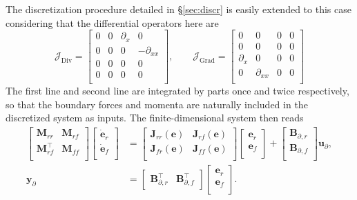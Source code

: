 \documentclass{svjour3}                     %
\newcommand{\secref}[1]{\S\ref{#1}}
\DeclareMathOperator*{\Grad}{Grad}
\DeclareMathOperator*{\Div}{Div}
\begin{document}
The discretization procedure detailed in \secref{sec:discr} is easily extended to this case considering that the differential operators here are 
\[
\bm{\mathcal{J}}_{\Div} = \begin{bmatrix}
0 & 0 & \partial_x & 0 \\
0 & 0 & 0 & -\partial_{xx} \\
0 & 0 & 0 & 0 \\
0 & 0 & 0 & 0 \\
\end{bmatrix}, \qquad 
\bm{\mathcal{J}}_{\Grad} = \begin{bmatrix}
0 & 0 & 0 & 0 \\
0 & 0 & 0 & 0 \\
\partial_x & 0 & 0 & 0 \\
0 & \partial_{xx} & 0 & 0 \\
\end{bmatrix}
\]
The first line and second line are integrated by parts once and twice respectively, so that the boundary forces and momenta are naturally included in the discretized system as inputs. The finite-dimensional system then reads
\begin{equation}
\label{eq:EB_sys}
\begin{aligned}
\begin{bmatrix}
\bm{M}_{rr} & \bm{M}_{rf}\\ 
\bm{M}_{rf}^{\top} & \bm{M}_{ff}\\
\end{bmatrix} 
\begin{bmatrix}
\dot{\bm{e}}_{r} \\ 
\dot{\bm{e}}_{f} \\ 
\end{bmatrix} &= 
\begin{bmatrix}
\bm{J}_{rr}(\bm{e}) & \bm{J}_{rf}(\bm{e})\\ 
\bm{J}_{fr}(\bm{e}) & \bm{J}_{ff}(\bm{e})\\
\end{bmatrix}  
\begin{bmatrix}
{\bm{e}}_{r} \\ 
{\bm{e}}_{f} \\ 
\end{bmatrix} + 
\begin{bmatrix}
\bm{B}_{\partial, r} \\ 
\bm{B}_{\partial, f} \\ 
\end{bmatrix}
 \bm{u}_\partial, \\
\bm{y}_\partial &= \begin{bmatrix}
\bm{B}_{\partial, r}^\top & \bm{B}_{\partial, f}^\top  
\end{bmatrix} \begin{bmatrix}
{\bm{e}}_{r} \\ 
{\bm{e}}_{f} \\ 
\end{bmatrix}.
\end{aligned}
\end{equation}
\end{document}
